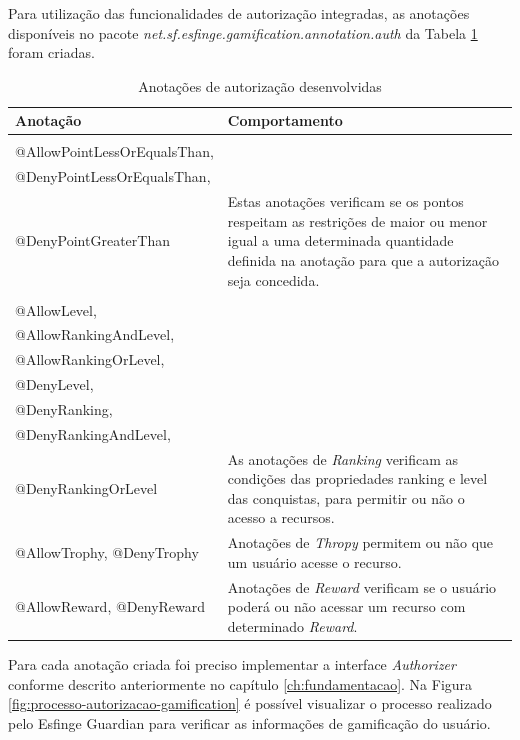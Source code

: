 \par Para utilização das funcionalidades de autorização integradas, as anotações disponíveis no pacote \textit{net.sf.esfinge.gamification.annotation.auth} da Tabela \ref{tab:autorizacoes} foram criadas.

\begin{longtable}{|l|m{9cm}|}
\caption{Anotações de autorização desenvolvidas}\\
\hline
Anotação & Comportamento \\ \hline
\endfirsthead
\endhead
\begin{tabular}[c]{@{}l@{}}
@AllowPointGreaterThan,\\ @AllowPointLessOrEqualsThan,\\ @DenyPointLessOrEqualsThan, \\ @DenyPointGreaterThan
\end{tabular} & Estas anotações verificam se os pontos respeitam as restrições de maior ou menor igual a uma determinada quantidade definida na anotação para que a autorização seja concedida. \\ \hline
\begin{tabular}[c]{@{}l@{}}
@AllowRanking,\\
@AllowLevel,\\ 
@AllowRankingAndLevel,\\
@AllowRankingOrLevel,\\ 
@DenyLevel,\\
@DenyRanking,\\ 
@DenyRankingAndLevel,\\
@DenyRankingOrLevel
\end{tabular} & As anotações de \textit{Ranking} verificam as condições das propriedades ranking e level das conquistas, para permitir ou não o acesso a recursos. \\ \hline
@AllowTrophy, @DenyTrophy & Anotações de \textit{Thropy} permitem ou não que um usuário acesse o recurso. \\ \hline
@AllowReward, @DenyReward & Anotações de \textit{Reward} verificam se o usuário poderá ou não acessar um recurso com determinado \textit{Reward}.
\label{tab:autorizacoes}
\\ \hline
\end{longtable}

\par Para cada anotação criada foi preciso implementar a interface \textit{Authorizer} conforme descrito anteriormente no capítulo \ref{ch:fundamentacao}. Na Figura \ref{fig:processo-autorizacao-gamification} é possível visualizar o processo realizado pelo Esfinge Guardian para verificar as informações de gamificação do usuário.

